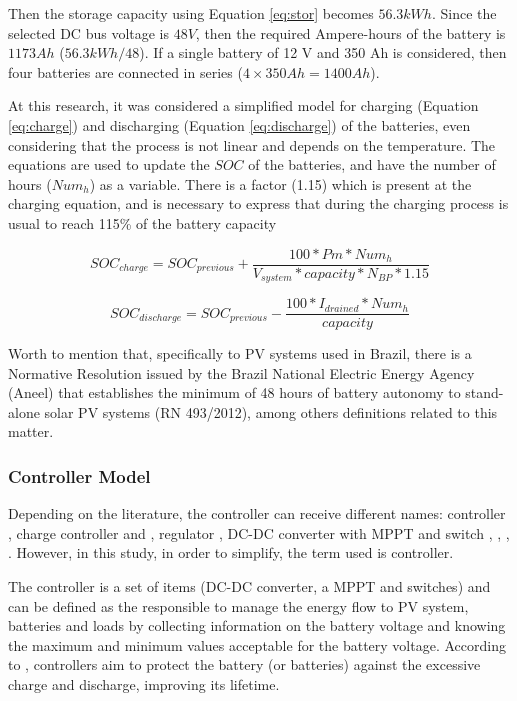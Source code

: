 Then the storage capacity using Equation \ref{eq:stor} becomes $56.3 kWh$. Since the selected DC bus voltage is $48 V$, then the required Ampere-hours of the battery is $1173 Ah$ ($56.3 kWh/48$). If a single battery of 12 V and 350 Ah is considered, then four batteries are connected in series ($4 \times 350 Ah = 1400 Ah$).

At this research, it was considered a simplified model for charging (Equation \ref{eq:charge}) and discharging (Equation \ref{eq:discharge}) of the batteries, even considering that the process is not linear and depends on the temperature. The equations are used to update the $SOC$ of the batteries, and have the number of hours ($ Num_{h} $) as a variable. There is a factor (1.15) which is present at the charging equation, and is necessary to express that during the charging process is usual to reach 115\% of the battery capacity

\begin{equation}
\label{eq:charge}
SOC_{charge} = SOC_{previous} + \dfrac{100*Pm*Num_{h}}{V_{system}*capacity*N_{BP}*1.15}
\end{equation}

\begin{equation}
\label{eq:discharge}
SOC_{discharge} = SOC_{previous} - \dfrac{100*I_{drained}*Num_{h}}{capacity}
\end{equation}

Worth to mention that, specifically to PV systems used in Brazil, there is a Normative Resolution issued by the Brazil National Electric Energy Agency (Aneel) that establishes the minimum of 48 hours of battery autonomy to stand-alone solar PV systems (RN 493/2012), among others definitions related to this matter.

\subsubsection{Controller Model}
\label{sec:controller}

Depending on the literature, the controller can receive different names: controller \cite{Hansen}, charge controller \cite{Mahanta} and \cite{Chauhan}, regulator \cite{Mellit}, DC-DC converter with MPPT and switch \cite{Dhanowa}, \cite{Yatimi}, \cite{Abdulateef}, \cite{Roy}. However, in this study, in order to simplify, the term used is controller. 

The controller is a set of items (DC-DC converter, a MPPT and switches) and can be defined as the responsible to manage the energy flow to PV system, batteries and loads by collecting information on the battery voltage and knowing the maximum and minimum values acceptable for the battery voltage. According to \cite{Pinho}, controllers aim to protect the battery (or batteries) against the excessive charge and discharge, improving its lifetime. 

